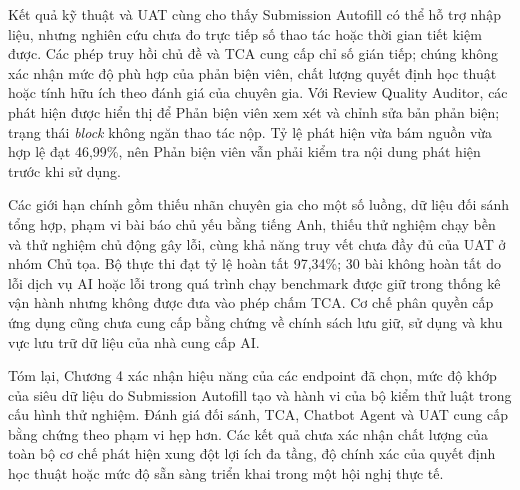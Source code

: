 Kết quả kỹ thuật và UAT cùng cho thấy Submission Autofill có thể hỗ trợ nhập liệu, nhưng nghiên cứu chưa đo trực tiếp số thao tác hoặc thời gian tiết kiệm được. Các phép truy hồi chủ đề và TCA cung cấp chỉ số gián tiếp; chúng không xác nhận mức độ phù hợp của phản biện viên, chất lượng quyết định học thuật hoặc tính hữu ích theo đánh giá của chuyên gia. Với Review Quality Auditor, các phát hiện được hiển thị để Phản biện viên xem xét và chỉnh sửa bản phản biện; trạng thái \textit{block} không ngăn thao tác nộp. Tỷ lệ phát hiện vừa bám nguồn vừa hợp lệ đạt 46,99\%, nên Phản biện viên vẫn phải kiểm tra nội dung phát hiện trước khi sử dụng.

Các giới hạn chính gồm thiếu nhãn chuyên gia cho một số luồng, dữ liệu đối sánh tổng hợp, phạm vi bài báo chủ yếu bằng tiếng Anh, thiếu thử nghiệm chạy bền và thử nghiệm chủ động gây lỗi, cùng khả năng truy vết chưa đầy đủ của UAT ở nhóm Chủ tọa. Bộ thực thi đạt tỷ lệ hoàn tất 97,34\%; 30 bài không hoàn tất do lỗi dịch vụ AI hoặc lỗi trong quá trình chạy benchmark được giữ trong thống kê vận hành nhưng không được đưa vào phép chấm TCA. Cơ chế phân quyền cấp ứng dụng cũng chưa cung cấp bằng chứng về chính sách lưu giữ, sử dụng và khu vực lưu trữ dữ liệu của nhà cung cấp AI.

Tóm lại, Chương 4 xác nhận hiệu năng của các endpoint đã chọn, mức độ khớp của siêu dữ liệu do Submission Autofill tạo và hành vi của bộ kiểm thử luật trong cấu hình thử nghiệm. Đánh giá đối sánh, TCA, Chatbot Agent và UAT cung cấp bằng chứng theo phạm vi hẹp hơn. Các kết quả chưa xác nhận chất lượng của toàn bộ cơ chế phát hiện xung đột lợi ích đa tầng, độ chính xác của quyết định học thuật hoặc mức độ sẵn sàng triển khai trong một hội nghị thực tế.
